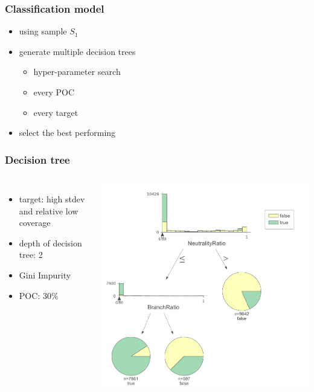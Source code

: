 

\begin{frame}
	\frametitle{Classification model}
	
	\begin{itemize}
		\item using sample $S_1$
		\item generate multiple decision trees
		\begin{itemize}
			\item hyper-parameter search
			\item every POC
			\item every target
		\end{itemize}
		\item select the best performing
	\end{itemize}
	
\end{frame}

\begin{frame}
	\frametitle{Decision tree}
	
	\begin{columns}[c]
		
		
		\begin{itemize}
			\item target: high stdev and relative low coverage
			\item depth of decision tree: 2
			\item Gini Impurity
			\item POC: 30\%
		\end{itemize}
		
		\includegraphics[height=0.8\textheight]{figures/decision_tree}
		
	\end{columns}
	
	
\end{frame}